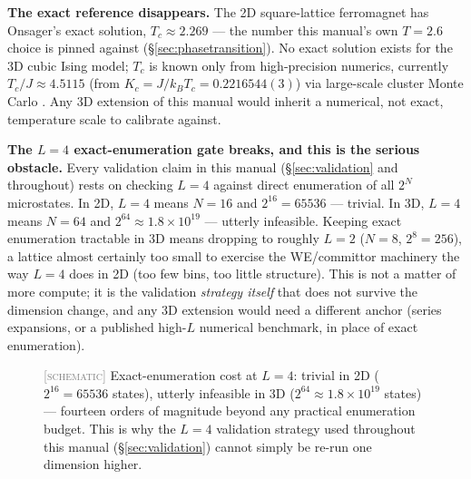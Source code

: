 \documentclass[11pt,a4paper]{article}
\newcommand{\SCHEM}{\textcolor{gray}{\footnotesize[\textsc{schematic}]}}
\begin{document}
\textbf{The exact reference disappears.} The 2D square-lattice ferromagnet has Onsager's exact
solution, $T_c\approx2.269$ \cite{onsager1944} --- the number this manual's own $T=2.6$ choice is
pinned against (\S\ref{sec:phasetransition}). No exact solution exists for the 3D cubic Ising
model; $T_c$ is known only from high-precision numerics, currently
$T_c/J\approx4.5115$ (from $K_c=J/k_BT_c=0.2216544(3)$) via large-scale cluster Monte Carlo
\cite{talapov1996}. Any 3D extension of this manual would inherit a numerical, not exact,
temperature scale to calibrate against.

\textbf{The $L=4$ exact-enumeration gate breaks, and this is the serious obstacle.} Every
validation claim in this manual (\S\ref{sec:validation} and throughout) rests on checking $L=4$
against direct enumeration of all $2^N$ microstates. In 2D, $L=4$ means $N=16$ and $2^{16}=65536$
--- trivial. In 3D, $L=4$ means $N=64$ and $2^{64}\approx1.8\times10^{19}$ --- utterly
infeasible. Keeping exact enumeration tractable in 3D means dropping to roughly $L=2$
($N=8$, $2^8=256$), a lattice almost certainly too small to exercise the WE/committor machinery
the way $L=4$ does in 2D (too few bins, too little structure). This is not a matter of more
compute; it is the validation \emph{strategy itself} that does not survive the dimension change,
and any 3D extension would need a different anchor (series expansions, or a published high-$L$
numerical benchmark, in place of exact enumeration).

\begin{figure}[H]\centering
{}
\caption{\SCHEM{} Exact-enumeration cost at $L=4$: trivial in 2D ($2^{16}=65536$ states),
utterly infeasible in 3D ($2^{64}\approx1.8\times10^{19}$ states) --- fourteen orders of
magnitude beyond any practical enumeration budget. This is why the $L=4$ validation strategy
used throughout this manual (\S\ref{sec:validation}) cannot simply be re-run one dimension
higher.}
\label{fig:statespace}
\end{figure}
\end{document}
